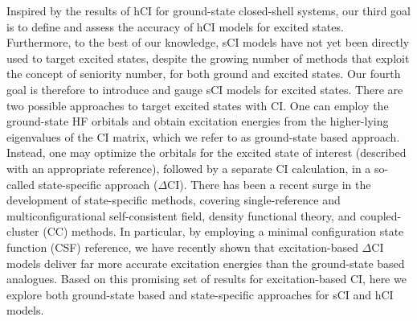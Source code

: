 \documentclass[aip,jcp,reprint,noshowkeys,superscriptaddress]{revtex4-1}
\begin{document}
Inspired by the results of hCI for ground-state closed-shell systems, \cite{Kossoski_2022} our third goal is to define and assess the accuracy of hCI models for excited states.
Furthermore, to the best of our knowledge, sCI models have not yet been directly used to target excited states,
despite the growing number of methods that exploit the concept of seniority number,
for both ground
\cite{Limacher_2013,Limacher_2014,Tecmer_2014,Boguslawski_2014a,Boguslawski_2015,Boguslawski_2014b,Boguslawski_2014c,Johnson_2020,Henderson_2014,Stein_2014,Henderson_2015,Chen_2015,Bytautas_2018,Marie_2021,Boguslawski_2021,Tecmer_2022,Mamache_2023} 
and excited states.
\cite{Boguslawski_2016b,Boguslawski_2016c,Boguslawski_2019,Nowak_2019,Kossoski_2021,Marie_2021,Tecmer_2022,Rishi_2023,Nowak_2023} 
Our fourth goal is therefore to introduce and gauge sCI models for excited states.
There are two possible approaches to target excited states with CI.
One can employ the ground-state HF orbitals and obtain excitation energies from the higher-lying eigenvalues of the CI matrix, which we refer to as ground-state based approach.
Instead, one may optimize the orbitals for the excited state of interest (described with an appropriate reference), followed by a separate CI calculation,
in a so-called state-specific approach ($\Delta$CI).
There has been a recent surge in the development of state-specific methods, covering 
single-reference and multiconfigurational self-consistent field,
\cite{Ziegler_1977,Burton_2021,Shea_2018,Tran_2019,Tran_2020,Hardikar_2020,Burton_2022,Hanscam_2022,Kossoski_2023,Marie_2023}
density functional theory, 
\cite{Filatov_1999,Kowalczyk_2011,Kowalczyk_2013,Gilbert_2008,Barca_2018,Hait_2020,Hait_2021,Hardikar_2020,Zhao_2020,Levi_2020,Carter-Fenk_2020,Toffoli_2022,Schmerwitz_2022}
and coupled-cluster (CC)
\cite{Piecuch_2000,Mayhall_2010,Lee_2019,Kossoski_2021,Marie_2021,Rishi_2023}
methods.
In particular, by employing a minimal configuration state function (CSF) reference, 
we have recently shown that excitation-based $\Delta$CI models deliver far more accurate excitation energies than the ground-state based analogues. \cite{Kossoski_2023}
Based on this promising set of results for excitation-based CI, here we explore both ground-state based and state-specific approaches for sCI and hCI models.
\end{document}

